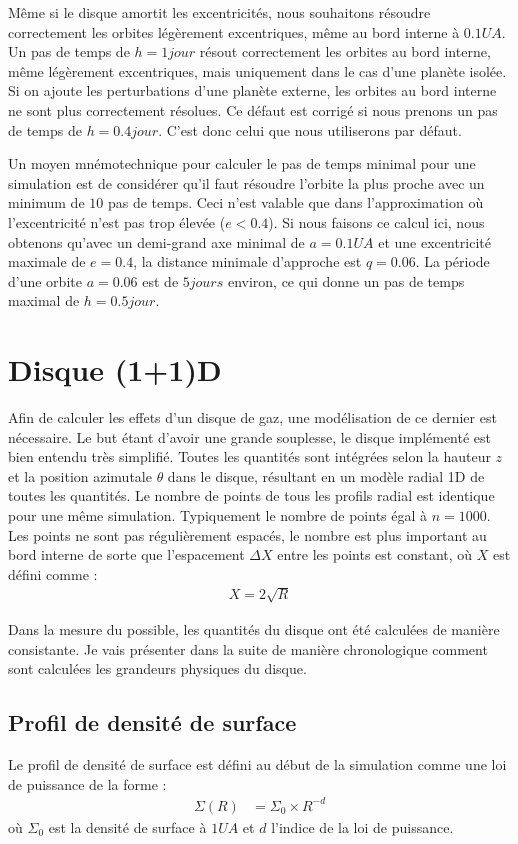 Même si le disque amortit les excentricités, nous souhaitons résoudre correctement les orbites légèrement excentriques, même au bord interne à $0.1\unit{UA}$. Un pas de temps de $h=1\unit{jour}$ résout correctement les orbites au bord interne, même légèrement excentriques, mais uniquement dans le cas d'une planète isolée. Si on ajoute les perturbations d'une planète externe, les orbites au bord interne ne sont plus correctement résolues. Ce défaut est corrigé si nous prenons un pas de temps de $h=0.4\unit{jour}$. C'est donc celui que nous utiliserons par défaut.

Un moyen mnémotechnique pour calculer le pas de temps minimal pour une simulation est de considérer qu'il faut résoudre l'orbite la plus proche avec un minimum de $10$ pas de temps. Ceci n'est valable que dans l'approximation où l'excentricité n'est pas trop élevée ($e<0.4$). Si nous faisons ce calcul ici, nous obtenons qu'avec un demi-grand axe minimal de $a=0.1\unit{UA}$ et une excentricité maximale de $e=0.4$, la distance minimale d'approche est $q=0.06$. La période d'une orbite $a=0.06$ est de $5\unit{jours}$ environ, ce qui donne un pas de temps maximal de $h=0.5\unit{jour}$. 

\section{Disque (1+1)D}
Afin de calculer les effets d'un disque de gaz, une modélisation de ce dernier est nécessaire. Le but étant d'avoir une grande souplesse, le disque implémenté est bien entendu très simplifié. Toutes les quantités sont intégrées selon la hauteur $z$ et la position azimutale $\theta$ dans le disque, résultant en un modèle radial 1D de toutes les quantités. Le nombre de points de tous les profils radial est identique pour une même simulation. Typiquement le nombre de points égal à $n=1000$. Les points ne sont pas régulièrement espacés, le nombre est plus important au bord interne de sorte que l'espacement $\Delta X$ entre les points est constant, où $X$ est défini comme : 
\begin{align}
X = 2\sqrt{R}
\end{align}

Dans la mesure du possible, les quantités du disque ont été calculées de manière consistante. Je vais présenter dans la suite de manière chronologique comment sont calculées les grandeurs physiques du disque.

\subsection{Profil de densité de surface}
Le profil de densité de surface est défini au début de la simulation comme une loi de puissance de la forme :
\begin{align}
\Sigma(R) &= \Sigma_0 \times R^{-d}
\end{align}
où $\Sigma_0$ est la densité de surface à $1\unit{UA}$ et $d$ l'indice de la loi de puissance. 

